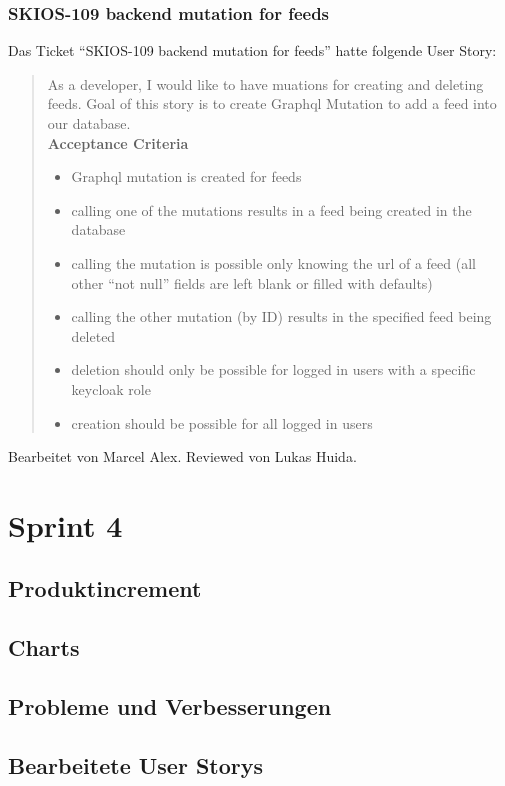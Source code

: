 \subsubsection{SKIOS-109 backend mutation for feeds}
Das Ticket \enquote{SKIOS-109 backend mutation for feeds} hatte folgende User Story:
\begin{quotation}
As a developer, I would like to have muations for creating and deleting feeds.
Goal of this story is to create Graphql Mutation to add a feed into our database. \\
\textbf{Acceptance Criteria}
\begin{itemize}
    \item Graphql mutation is created for feeds
    \item calling one of the mutations results in a feed being created in the database
    \item calling the mutation is possible only knowing the url of a feed (all other “not null” fields are left blank or filled with defaults)
    \item calling the other mutation (by ID) results in the specified feed being deleted
    \item deletion should only be possible for logged in users with a specific keycloak role
    \item creation should be possible for all logged in users
\end{itemize}
\end{quotation}
Bearbeitet von Marcel Alex.
Reviewed von Lukas Huida.

\section{Sprint 4}
\subsection{Produktincrement}
\subsection{Charts}
\subsection{Probleme und Verbesserungen}

\subsection{Bearbeitete User Storys}
